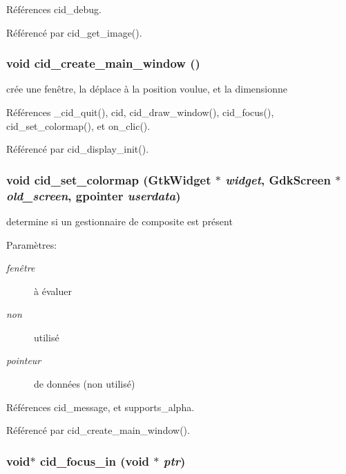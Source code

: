 Références cid\_\-debug.

Référencé par cid\_\-get\_\-image().
\subsubsection{\setlength{\rightskip}{0pt plus 5cm}void cid\_\-create\_\-main\_\-window ()}\label{cid-main_8c_2640d4b07379342354919e9a4ca1dae4}


crée une fenêtre, la déplace à la position voulue, et la dimensionne 

Références \_\-cid\_\-quit(), cid, cid\_\-draw\_\-window(), cid\_\-focus(), cid\_\-set\_\-colormap(), et on\_\-clic().

Référencé par cid\_\-display\_\-init().
\subsubsection{\setlength{\rightskip}{0pt plus 5cm}void cid\_\-set\_\-colormap (GtkWidget $\ast$ {\em widget}, \/  GdkScreen $\ast$ {\em old\_\-screen}, \/  gpointer {\em userdata})}\label{cid-main_8c_2839de6472a3afc45911b4856e156443}


determine si un gestionnaire de composite est présent \begin{Desc}
\item[Paramètres:]
\begin{description}
\item[{\em fenêtre}]à évaluer \item[{\em non}]utilisé \item[{\em pointeur}]de données (non utilisé) \end{description}
\end{Desc}


Références cid\_\-message, et supports\_\-alpha.

Référencé par cid\_\-create\_\-main\_\-window().
\subsubsection{\setlength{\rightskip}{0pt plus 5cm}void$\ast$ cid\_\-focus\_\-in (void $\ast$ {\em ptr})}\label{cid-main_8c_a53192e6cf65fed138464d9852e38b30}




